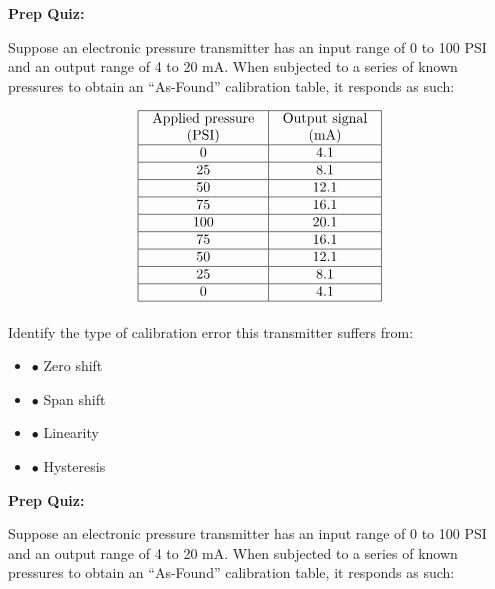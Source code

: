 





\vfil \eject

\noindent
{\bf Prep Quiz:}

Suppose an electronic pressure transmitter has an input range of 0 to 100 PSI and an output range of 4 to 20 mA.  When subjected to a series of known pressures to obtain an ``As-Found'' calibration table, it responds as such:


$$\vbox{\offinterlineskip
\halign{\strut
\vrule \quad\hfil # \ \hfil & 
\vrule \quad\hfil # \ \hfil \vrule \cr
\noalign{\hrule}
%
Applied pressure & Output signal \cr
%
(PSI) & (mA) \cr
%
\noalign{\hrule}
%
0 & 4.1 \cr
%
\noalign{\hrule}
%
25 & 8.1 \cr
%
\noalign{\hrule}
%
50 & 12.1 \cr
%
\noalign{\hrule}
%
75 & 16.1 \cr
%
\noalign{\hrule}
%
100 & 20.1 \cr
%
\noalign{\hrule}
%
75 & 16.1 \cr
%
\noalign{\hrule}
%
50 & 12.1 \cr
%
\noalign{\hrule}
%
25 & 8.1 \cr
%
\noalign{\hrule}
%
0 & 4.1 \cr
%
\noalign{\hrule}
} %
}$$ %

\vskip 10pt

Identify the type of calibration error this transmitter suffers from:

\begin{itemize}
\item{$\bullet$} Zero shift
\vskip 5pt 
\item{$\bullet$} Span shift
\vskip 5pt 
\item{$\bullet$} Linearity
\vskip 5pt 
\item{$\bullet$} Hysteresis
\medskip
\end{itemize}


\vfil \eject

\noindent
{\bf Prep Quiz:}

Suppose an electronic pressure transmitter has an input range of 0 to 100 PSI and an output range of 4 to 20 mA.  When subjected to a series of known pressures to obtain an ``As-Found'' calibration table, it responds as such:


